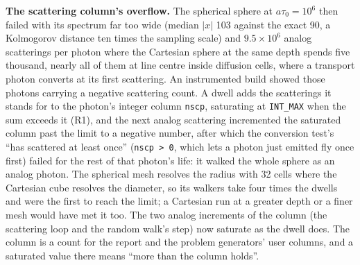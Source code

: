 \documentclass[11pt]{article}
\begin{document}
\textbf{The scattering column's overflow.}  The spherical sphere at $a\tau_0 =
10^6$ then failed with its spectrum far too wide (median $|x|$ 103 against the exact
90, a Kolmogorov distance ten times the sampling scale) and $9.5\times10^6$ analog
scatterings per photon where the Cartesian sphere at the same depth spends five
thousand, nearly all of them at line centre inside diffusion cells, where a transport
photon converts at its first scattering.  An instrumented build showed those photons
carrying a negative scattering count.  A dwell adds the scatterings it stands for to
the photon's integer column \texttt{nscp}, saturating at \texttt{INT\_MAX} when the
sum exceeds it (R1), and the next analog scattering incremented the saturated column
past the limit to a negative number, after which the conversion test's ``has
scattered at least once'' (\texttt{nscp > 0}, which lets a photon just emitted fly
once first) failed for the rest of that photon's life: it walked the whole sphere as
an analog photon.  The spherical mesh resolves the radius with 32 cells where the
Cartesian cube resolves the diameter, so its walkers take four times the dwells and
were the first to reach the limit; a Cartesian run at a greater depth or a finer mesh
would have met it too.  The two analog increments of the column (the scattering
loop and the random walk's step) now saturate as the dwell does.  The column is a
count for the report and the problem generators' user columns, and a saturated value
there means ``more than the column holds''.
\end{document}
